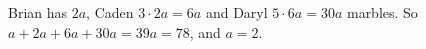Brian has $2a$, Caden $3\cdot2a=6a$ and Daryl $5\cdot6a=30a$ marbles. So $a+2a+6a+30a=39a=78$, and $a=\boxed{2}$.
